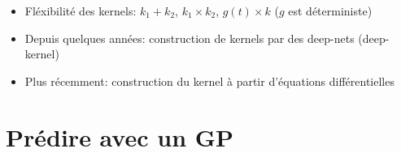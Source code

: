 \documentclass[xcolor=svgnames, t]{beamer}
\begin{document}
\begin{frame}{\subsecname}
  
  \begin{itemize}
    \item Fléxibilité des kernels: $k_1 + k_2$, $k_1 \times k_2$, $g(t) \times k$ ($g$ est déterministe)
  \pause
    \item Depuis quelques années: construction de kernels par des deep-nets (deep-kernel)
  \pause
    \item Plus récemment: construction du kernel à  partir d'équations différentielles
  \end{itemize}
\end{frame}

\section{Prédire avec un GP}
\end{document}

